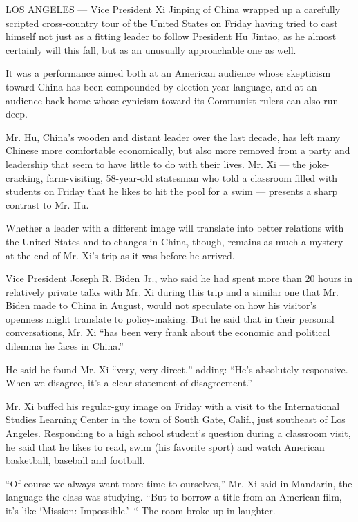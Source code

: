 LOS ANGELES --- Vice President Xi Jinping of China wrapped up a
carefully scripted cross-country tour of the United States on Friday
having tried to cast himself not just as a fitting leader to follow
President Hu Jintao, as he almost certainly will this fall, but as an
unusually approachable one as well.

It was a performance aimed both at an American audience whose skepticism
toward China has been compounded by election-year language, and at an
audience back home whose cynicism toward its Communist rulers can also
run deep.

Mr. Hu, China's wooden and distant leader over the last decade, has left
many Chinese more comfortable economically, but also more removed from a
party and leadership that seem to have little to do with their lives.
Mr. Xi --- the joke-cracking, farm-visiting, 58-year-old statesman who
told a classroom filled with students on Friday that he likes to hit the
pool for a swim --- presents a sharp contrast to Mr. Hu.

Whether a leader with a different image will translate into better
relations with the United States and to changes in China, though,
remains as much a mystery at the end of Mr. Xi's trip as it was before
he arrived.

Vice President Joseph R. Biden Jr., who said he had spent more than 20
hours in relatively private talks with Mr. Xi during this trip and a
similar one that Mr. Biden made to China in August, would not speculate
on how his visitor's openness might translate to policy-making. But he
said that in their personal conversations, Mr. Xi ``has been very frank
about the economic and political dilemma he faces in China.''

He said he found Mr. Xi ``very, very direct,'' adding: ``He's absolutely
responsive. When we disagree, it's a clear statement of disagreement.''

Mr. Xi buffed his regular-guy image on Friday with a visit to the
International Studies Learning Center in the town of South Gate, Calif.,
just southeast of Los Angeles. Responding to a high school student's
question during a classroom visit, he said that he likes to read, swim
(his favorite sport) and watch American basketball, baseball and
football.

``Of course we always want more time to ourselves,'' Mr. Xi said in
Mandarin, the language the class was studying. ``But to borrow a title
from an American film, it's like `Mission: Impossible.'~`` The room
broke up in laughter.

